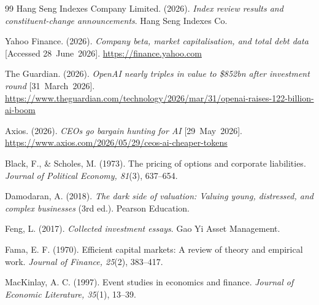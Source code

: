 \documentclass[11pt]{article}
\begin{document}
\begin{thebibliography}{99}
Hang Seng Indexes Company Limited. (2026). \emph{Index review results and constituent-change announcements}.
Hang Seng Indexes Co.

Yahoo Finance. (2026). \emph{Company beta, market capitalisation, and total debt data} [Accessed
28~June~2026]. \url{https://finance.yahoo.com}

The Guardian. (2026). \emph{OpenAI nearly triples in value to \$852bn after investment round}
[31~March~2026]. \url{https://www.theguardian.com/technology/2026/mar/31/openai-raises-122-billion-ai-boom}

Axios. (2026). \emph{CEOs go bargain hunting for AI} [29~May~2026].
\url{https://www.axios.com/2026/05/29/ceos-ai-cheaper-tokens}

Black, F., \& Scholes, M. (1973). The pricing of options and corporate liabilities. \emph{Journal of
Political Economy, 81}(3), 637--654.

Damodaran, A. (2018). \emph{The dark side of valuation: Valuing young, distressed, and complex businesses}
(3rd ed.). Pearson Education.

Feng, L. (2017). \emph{Collected investment essays}. Gao Yi Asset Management.

Fama, E. F. (1970). Efficient capital markets: A review of theory and empirical work. \emph{Journal of
Finance, 25}(2), 383--417.

MacKinlay, A. C. (1997). Event studies in economics and finance. \emph{Journal of Economic Literature,
35}(1), 13--39.

\end{thebibliography}
\end{document}
